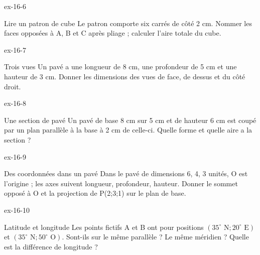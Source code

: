 \clearpage{}
\begin{blocLivre}{ex-16-6}\begin{exercice}[2]{Lire un patron de cube}
Le patron comporte six carrés de côté 2 cm. Nommer les faces opposées à A, B et C après pliage ; calculer l’aire totale du cube.
\label{fig-ex-16-6}
\end{exercice}\end{blocLivre}
\begin{blocLivre}{ex-16-7}\begin{exercice}[2]{Trois vues}
Un pavé a une longueur de 8 cm, une profondeur de 5 cm et une hauteur de 3 cm. Donner les dimensions des vues de face, de dessus et du côté droit.
\label{fig-ex-16-7}
\end{exercice}\end{blocLivre}
\begin{blocLivre}{ex-16-8}\begin{exercice}[2]{Une section de pavé}
Un pavé de base 8 cm sur 5 cm et de hauteur 6 cm est coupé par un plan parallèle à la base à 2 cm de celle-ci. Quelle forme et quelle aire a la section ?
\label{fig-ex-16-8}
\end{exercice}\end{blocLivre}
\begin{blocLivre}{ex-16-9}\begin{exercice}[2]{Des coordonnées dans un pavé}
Dans le pavé de dimensions 6, 4, 3 unités, O est l’origine ; les axes suivent longueur, profondeur, hauteur. Donner le sommet opposé à O et la projection de P(2;3;1) sur le plan de base.
\label{fig-ex-16-9}
\end{exercice}\end{blocLivre}
\begin{blocLivre}{ex-16-10}\begin{exercice}[2]{Latitude et longitude}
Les points fictifs A et B ont pour positions $(35^\circ\text{ N};20^\circ\text{ E})$ et $(35^\circ\text{ N};50^\circ\text{ O})$. Sont-ils sur le même parallèle ? Le même méridien ? Quelle est la différence de longitude ?
\label{fig-ex-16-10}
\end{exercice}\end{blocLivre}

